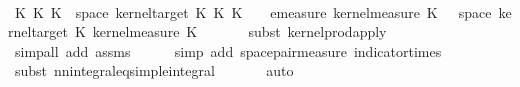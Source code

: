 \begin{isabellebody}
\ \ \isamarkupfalse%
\ \isamarkupfalse%
\ {\isachardoublequoteopen}{\isacharparenleft}{\kern0pt}K{\isacharunderscore}{\kern0pt}{}\ {\isasymOtimes}\isactrlsub K\ K{\isacharunderscore}{\kern0pt}{}{\isacharparenright}{\kern0pt}\ {\isasymomega}\ {\isacharparenleft}{\kern0pt}space\ {\isacharparenleft}{\kern0pt}kernel{\isacharunderscore}{\kern0pt}target\ {\isacharparenleft}{\kern0pt}K{\isacharunderscore}{\kern0pt}{}\ {\isasymOtimes}\isactrlsub K\ K{\isacharunderscore}{\kern0pt}{}{\isacharparenright}{\kern0pt}{\isacharparenright}{\kern0pt}{\isacharparenright}{\kern0pt}\ {\isacharequal}{\kern0pt}\ {\isasymintegral}\isactrlsup {\isacharplus}{\kern0pt}\ {\isasymomega}\ emeasure\ {\isacharparenleft}{\kern0pt}kernel{\isacharunderscore}{\kern0pt}measure\ K{\isacharunderscore}{\kern0pt}{}\ {\isacharparenleft}{\kern0pt}{\isasymomega}{\isacharcomma}{\kern0pt}\ {\isasymomega}\ {\isacharparenleft}{\kern0pt}space\ {\isacharparenleft}{\kern0pt}kernel{\isacharunderscore}{\kern0pt}target\ K{\isacharunderscore}{\kern0pt}{}{\isacharparenright}{\kern0pt}{\isacharparenright}{\kern0pt}\ {\isasympartial}kernel{\isacharunderscore}{\kern0pt}measure\ K{\isacharunderscore}{\kern0pt}{}\ {\isasymomega}{\isachardoublequoteclose}\isanewline
\ \ \ \ \isamarkupfalse%
\ {\isacharparenleft}{\kern0pt}subst\ kernel{\isacharunderscore}{\kern0pt}prod{\isacharunderscore}{\kern0pt}apply{\isacharparenright}{\kern0pt}\isanewline
\ \ \ \ \isamarkupfalse%
\ {\isacharasterisk}{\kern0pt}\ \isamarkupfalse%
\ {\isacharparenleft}{\kern0pt}simp{\isacharunderscore}{\kern0pt}all\ add{\isacharcolon}{\kern0pt}\ assms{\isacharparenright}{\kern0pt}\isanewline
\ \ \ \ \isamarkupfalse%
\ {\isacharparenleft}{\kern0pt}simp\ add{\isacharcolon}{\kern0pt}\ space{\isacharunderscore}{\kern0pt}pair{\isacharunderscore}{\kern0pt}measure\ indicator{\isacharunderscore}{\kern0pt}times{\isacharparenright}{\kern0pt}\isanewline
\ \ \ \ \isamarkupfalse%
\ {\isacharparenleft}{\kern0pt}subst{\isacharparenleft}{\kern0pt}{}{\isacharparenright}{\kern0pt}\ nn{\isacharunderscore}{\kern0pt}integral{\isacharunderscore}{\kern0pt}eq{\isacharunderscore}{\kern0pt}simple{\isacharunderscore}{\kern0pt}integral{\isacharparenright}{\kern0pt}\isanewline
\ \ \ \ \ \isamarkupfalse%
\ auto\isanewline

\end{isabellebody}

